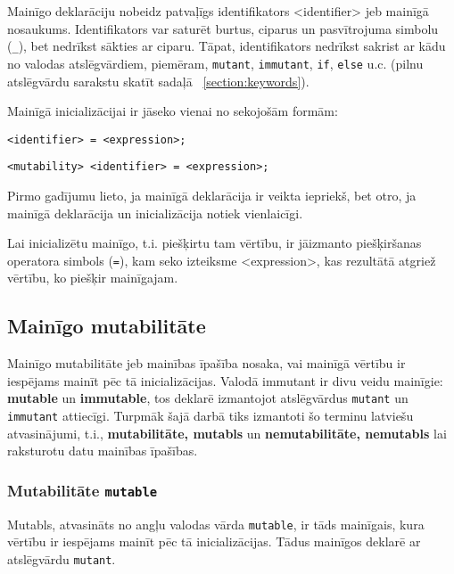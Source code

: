 \documentclass[12pt,a4paper]{report}
\begin{document}
Mainīgo deklarāciju nobeidz patvaļīgs identifikators <identifier> jeb mainīgā nosaukums. Identifikators var saturēt burtus, ciparus un pasvītrojuma simbolu (\texttt{\_}), bet nedrīkst sākties ar ciparu. Tāpat, identifikators nedrīkst sakrist ar kādu no valodas atslēgvārdiem, piemēram, \texttt{mutant}, \texttt{immutant}, \texttt{if}, \texttt{else} u.c. (pilnu atslēgvārdu sarakstu skatīt sadaļā ~\ref{section:keywords}).

Mainīgā inicializācijai ir jāseko vienai no sekojošām formām:

\begin{verbatim}
<identifier> = <expression>;
\end{verbatim}  

\begin{verbatim}
<mutability> <identifier> = <expression>;
\end{verbatim}  

Pirmo gadījumu lieto, ja mainīgā deklarācija ir veikta iepriekš, bet otro, ja mainīgā deklarācija un inicializācija notiek vienlaicīgi.

Lai inicializētu mainīgo, t.i. piešķirtu tam vērtību, ir jāizmanto piešķiršanas operatora simbols (\texttt{=}), kam seko izteiksme <expression>, kas rezultātā atgriež vērtību, ko piešķir mainīgajam.

\subsection{Mainīgo mutabilitāte}
\label{section:var-mutability}

Mainīgo mutabilitāte jeb mainības īpašība nosaka, vai mainīgā vērtību ir iespējams mainīt pēc tā inicializācijas. 
Valodā immutant ir divu veidu mainīgie: \textbf{mutable} un \textbf{immutable}, tos deklarē izmantojot atslēgvārdus \texttt{mutant} un \texttt{immutant} attiecīgi. Turpmāk šajā darbā tiks izmantoti šo terminu latviešu atvasinājumi, t.i., \textbf{mutabilitāte, mutabls} un \textbf{nemutabilitāte, nemutabls} lai raksturotu datu mainības īpašības.

\subsubsection{Mutabilitāte \texttt{mutable}}

Mutabls, atvasināts no angļu valodas vārda \texttt{mutable}, ir tāds mainīgais, kura vērtību ir iespējams mainīt pēc tā inicializācijas. Tādus mainīgos deklarē ar atslēgvārdu \texttt{mutant}.
\end{document}

